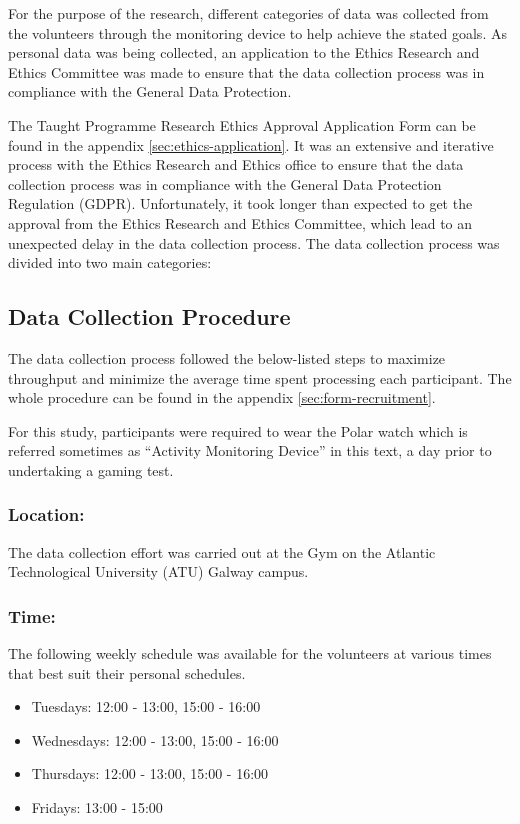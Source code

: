 For the purpose of the research, different categories of data was collected from the volunteers through the monitoring device to help achieve the stated goals. As personal data was
being collected, an application to the Ethics Research and Ethics Committee was made to ensure that the data collection process was in compliance with the General Data Protection.

\par 
The Taught Programme Research Ethics Approval Application Form can be found in the appendix \ref{sec:ethics-application}. It was an extensive and iterative process with the Ethics Research and Ethics 
office to ensure that the data collection process was in compliance with the General Data Protection Regulation (GDPR). Unfortunately, it took longer than expected to get the approval
from the Ethics Research and Ethics Committee, which lead to an unexpected delay in the data collection process. The data collection process was divided into two main categories:


\subsection{Data Collection Procedure}

The data collection process followed the below-listed steps to maximize throughput and minimize the average time spent processing each participant. The whole procedure can be found in the appendix \ref{sec:form-recruitment}.
\par
For this study, participants were required to wear the Polar watch which is referred sometimes as “Activity Monitoring Device” in this text, a day prior to undertaking a gaming test. 

\subsubsection*{Location:}

The data collection effort was carried out at the Gym on the Atlantic Technological University (ATU) Galway campus.

\subsubsection*{Time:}

The following weekly schedule was available for the volunteers at various times that best suit their personal schedules.
\begin{itemize}
    \item Tuesdays: 12:00 - 13:00, 15:00 - 16:00
    \item Wednesdays: 12:00 - 13:00, 15:00 - 16:00
    \item Thursdays: 12:00 - 13:00, 15:00 - 16:00
    \item Fridays: 13:00 - 15:00
\end{itemize}


